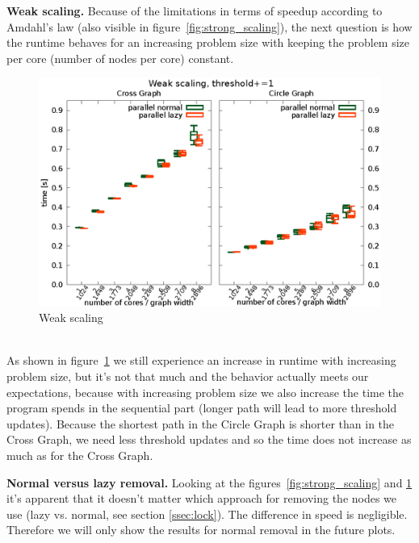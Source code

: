 \documentclass[letterpaper]{article}
\newcommand{\mypar}[1]{{\bf #1.}}
\begin{document}
\mypar{Weak scaling}
Because of the limitations in terms of speedup according to Amdahl's law (also visible in figure~\ref{fig:strong_scaling}), the next question is how the runtime behaves for an increasing problem size with keeping the problem size per core (number of nodes per core) constant.
\begin{figure}[h]\centering
  \includegraphics[scale=0.558]{weak_scaling.eps}
  \caption{Weak scaling\label{fig:weak_scaling}}
\end{figure}\\
As shown in figure~\ref{fig:weak_scaling} we still experience an increase in runtime with increasing problem size, but it's not that much and the behavior actually meets our expectations, because with increasing problem size we also increase the time the program spends in the sequential part (longer path will lead to more threshold updates). Because the shortest path in the Circle Graph is shorter than in the Cross Graph, we need less threshold updates and so the time does not increase as much as for the Cross Graph.

\mypar{Normal versus lazy removal} Looking at the figures~\ref{fig:strong_scaling} and \ref{fig:weak_scaling} it's apparent that it doesn't matter which approach for removing the nodes we use (lazy vs. normal, see section \ref{ssec:lock}). The difference in speed is negligible. Therefore we will only show the results for normal removal in the future plots.
\end{document}
